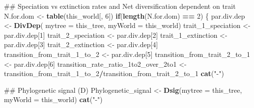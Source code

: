 \documentclass[]{book}
\newenvironment{Shaded}{\begin{snugshade}}{\end{snugshade}}
\newcommand{\KeywordTok}[1]{\textcolor[rgb]{0.13,0.29,0.53}{\textbf{{#1}}}}
\newcommand{\DataTypeTok}[1]{\textcolor[rgb]{0.13,0.29,0.53}{{#1}}}
\newcommand{\DecValTok}[1]{\textcolor[rgb]{0.00,0.00,0.81}{{#1}}}
\newcommand{\StringTok}[1]{\textcolor[rgb]{0.31,0.60,0.02}{{#1}}}
\newcommand{\ControlFlowTok}[1]{\textcolor[rgb]{0.13,0.29,0.53}{\textbf{{#1}}}}
\newcommand{\OperatorTok}[1]{\textcolor[rgb]{0.81,0.36,0.00}{\textbf{{#1}}}}
\newcommand{\NormalTok}[1]{{#1}}
\theoremstyle{definition}
\theoremstyle{definition}
\theoremstyle{definition}
\theoremstyle{remark}
\begin{document}
\begin{Shaded}
\begin{Highlighting}[]
{\NormalTok{    ## Speciation vs extinction rates and Net diversification dependent on trait}
\NormalTok{    N.for.dom <-}\StringTok{ }\KeywordTok{table}\NormalTok{(this_world[, }\DecValTok{6}\NormalTok{])}
    \ControlFlowTok{if}\NormalTok{(}\KeywordTok{length}\NormalTok{(N.for.dom) }\OperatorTok{==}\StringTok{ }\DecValTok{2}\NormalTok{) \{}
\NormalTok{      par.div.dep <-}\StringTok{ }\KeywordTok{DivDep}\NormalTok{( }\DataTypeTok{mytree =}\NormalTok{ this_tree, }\DataTypeTok{myWorld =}\NormalTok{ this_world)}
\NormalTok{      trait_1_speciation <-}\StringTok{ }\NormalTok{par.div.dep[}\DecValTok{1}\NormalTok{]}
\NormalTok{      trait_2_speciation <-}\StringTok{ }\NormalTok{par.div.dep[}\DecValTok{2}\NormalTok{]}
\NormalTok{      trait_1_extinction <-}\StringTok{ }\NormalTok{par.div.dep[}\DecValTok{3}\NormalTok{]}
\NormalTok{      trait_2_extinction <-}\StringTok{ }\NormalTok{par.div.dep[}\DecValTok{4}\NormalTok{]}
\NormalTok{      transition_from_trait_1_to_}\DecValTok{2}\NormalTok{ <-}\StringTok{ }\NormalTok{par.div.dep[}\DecValTok{5}\NormalTok{]}
\NormalTok{      transition_from_trait_2_to_}\DecValTok{1}\NormalTok{ <-}\StringTok{ }\NormalTok{par.div.dep[}\DecValTok{6}\NormalTok{]}
\NormalTok{      transition_rate_ratio_1to2_over_2to1 <-}\StringTok{ }\NormalTok{transition_from_trait_1_to_}\DecValTok{2}\OperatorTok{/}\NormalTok{transition_from_trait_2_to_}\DecValTok{1}
      \KeywordTok{cat}\NormalTok{(}\StringTok{"-"}\NormalTok{)}

\NormalTok{      ## Phylogenetic signal (D)}
\NormalTok{      Phylogenetic_signal <-}\StringTok{ }\KeywordTok{Dsig}\NormalTok{(}\DataTypeTok{mytree =}\NormalTok{ this_tree, }\DataTypeTok{myWorld =}\NormalTok{ this_world)}
      \KeywordTok{cat}\NormalTok{(}\StringTok{"-"}\NormalTok{)}

}
\end{Highlighting}
\end{Shaded}
\end{document}
